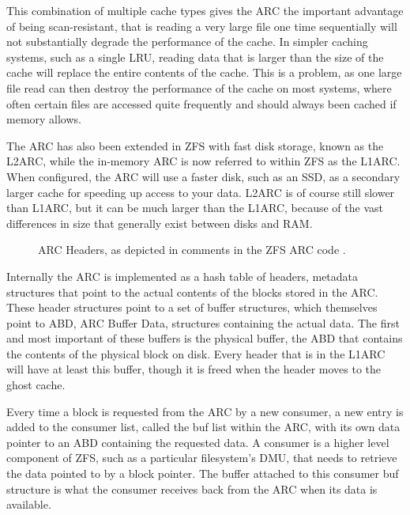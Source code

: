 This combination of multiple cache types gives the ARC the important advantage of being scan-resistant,
that is reading a very large file one time sequentially will not substantially degrade the performance of the cache.
In simpler caching systems, such as a single LRU, reading data that is larger than the size of the cache will replace the entire
contents of the cache.
This is a problem, as one large file read can then destroy the performance of the cache on most systems,
where often certain files are accessed quite frequently and should always been cached if memory allows.

The ARC has also been extended in ZFS with fast disk storage, known as the L2ARC,
while the in-memory ARC is now referred to within ZFS as the L1ARC.
When configured, the ARC will use a faster disk, such as an SSD, as a secondary larger cache for speeding up access to your data.
L2ARC is of course still slower than L1ARC, but it can be much larger than the L1ARC,
because of the vast differences in size that generally exist between disks and RAM.

\begin{figure}
    \centering
    \resizebox{0.75\linewidth}{!}{}
    \captionsetup{width=0.75\linewidth}
    \caption{ARC Headers, as depicted in comments in the ZFS ARC code \cite[{module/zfs/arc.c}]{zfs}.}
    \label{fig:ARCHeaders}
\end{figure}

Internally the ARC is implemented as a hash table of headers, metadata structures that point to the actual contents of the blocks
stored in the ARC.
These header structures point to a set of buffer structures, which themselves point to ABD, ARC Buffer Data, structures
containing the actual data.
The first and most important of these buffers is the physical buffer, the ABD that contains the contents of the physical block on disk.
Every header that is in the L1ARC will have at least this buffer, though it is freed when the header moves to the ghost cache.

Every time a block is requested from the ARC by a new consumer, a new entry is added to the consumer list, 
called the buf list within the ARC, with its own data pointer to an ABD containing the requested data.
A consumer is a higher level component of ZFS, such as a particular filesystem's DMU, 
that needs to retrieve the data pointed to by a block pointer.
The buffer attached to this consumer buf structure is what the consumer receives back from the ARC when its data is available.

